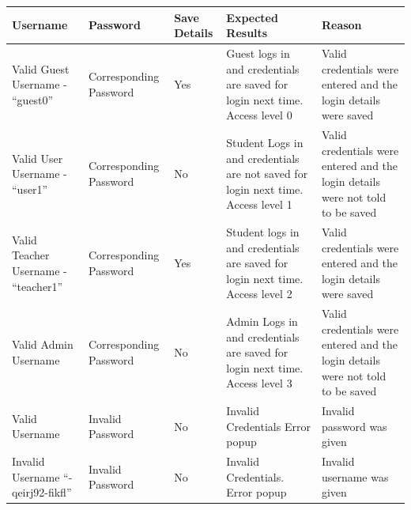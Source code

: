 \documentclass[oneside,openany,11pt,a4paper]{report}
\begin{document}
\begin{longtable}{|p{3cm}|p{3cm}|p{3cm}|p{3cm}|p{3cm}|}
	\hline
	\rowcolor{gray!50}
	\textbf{Username} & \textbf{Password} & \textbf{Save Details} & \textbf{Expected Results} & \textbf{Reason}\\ \hline
	Valid Guest Username - “guest0” & Corresponding Password & Yes & Guest logs in and credentials are saved for login next time. Access level 0 & Valid credentials were entered and the login details were saved \\ \hline
	
	Valid User Username - “user1” & Corresponding Password & No & Student Logs in and credentials are not saved for login next time. Access level 1 &  Valid credentials were entered and the login details were not told to be saved \\ \hline
	
Valid Teacher Username - “teacher1” & 	Corresponding Password & Yes & Student logs in and credentials are saved for login next time. Access level 2 & Valid credentials were entered and the login details were saved \\ \hline

Valid Admin Username & Corresponding Password & No & Admin Logs in and credentials are saved for login next time. Access level 3 & Valid credentials were entered and the login details were not told to be saved \\ \hline

Valid Username & Invalid Password & No & Invalid Credentials Error popup & Invalid password was given \\ \hline

Invalid Username “-qeirj92-fikfl” & Invalid Password & No & Invalid Credentials. Error popup & Invalid username was given \\ \hline
	
\end{longtable}
\end{document}
